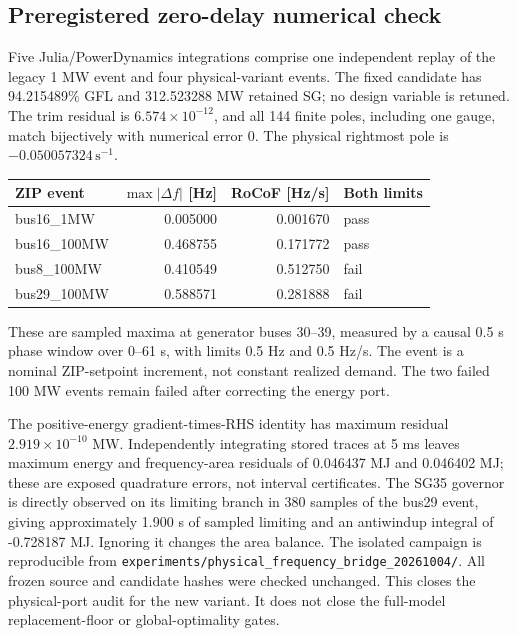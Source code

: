 \documentclass[11pt]{article}
\begin{document}
\subsection{Preregistered zero-delay numerical check}
Five Julia/PowerDynamics integrations comprise one independent replay of the
legacy 1 MW event and four physical-variant events. The fixed candidate has
94.215489\% GFL and 312.523288 MW retained SG;
no design variable is retuned. The trim residual is
$6.574\times10^{-12}$, and all 144 finite poles,
including one gauge, match bijectively with numerical error
$0$. The physical rightmost pole is
$-0.050057324\,\mathrm{s}^{-1}$.

\begin{center}\begin{tabular}{lrrl}\toprule
ZIP event & $\max|\Delta f|$ [Hz] & RoCoF [Hz/s] & Both limits\\\midrule
bus16\_1MW & 0.005000 & 0.001670 & pass \\
bus16\_100MW & 0.468755 & 0.171772 & pass \\
bus8\_100MW & 0.410549 & 0.512750 & fail \\
bus29\_100MW & 0.588571 & 0.281888 & fail \\
\bottomrule\end{tabular}\end{center}
These are sampled maxima at generator buses 30--39, measured by a causal
0.5 s phase window over 0--61 s, with limits 0.5 Hz and 0.5 Hz/s.
The event is a nominal ZIP-setpoint increment, not constant realized demand.
The two failed 100 MW events remain failed after correcting the energy port.

The positive-energy gradient-times-RHS identity has maximum residual
$2.919\times10^{-10}$ MW. Independently integrating stored
traces at 5 ms leaves maximum energy and frequency-area residuals of
0.046437 MJ and
0.046402 MJ; these are exposed quadrature
errors, not interval certificates. The SG35 governor is directly observed
on its limiting branch in 380 samples of the
bus29 event, giving approximately 1.900 s
of sampled limiting and an antiwindup integral of
-0.728187 MJ. Ignoring it changes the area balance.
The isolated campaign is reproducible from
\texttt{experiments/physical\_frequency\_bridge\_20261004/}.
All frozen source and candidate hashes were checked unchanged.
This closes the physical-port audit for the new variant. It does not close
the full-model replacement-floor or global-optimality gates.


\end{document}
